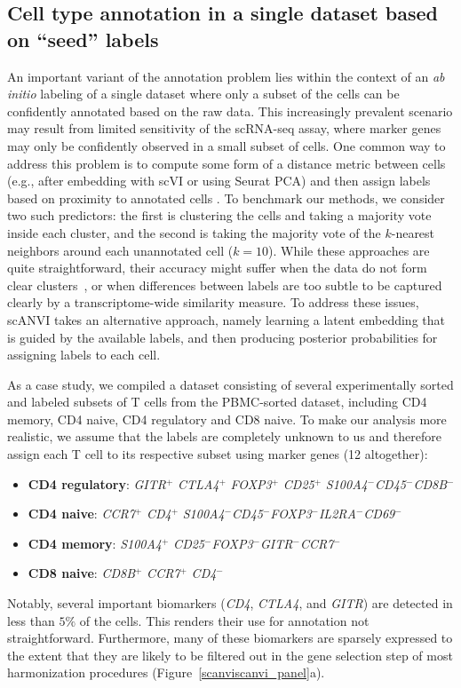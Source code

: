 \subsection{Cell type annotation in a single dataset based on ``seed'' labels}
An important variant of the annotation problem lies within the context of an \textit{ab initio} labeling of a single dataset where only a subset of the cells can be confidently annotated based on the raw data. This increasingly prevalent scenario may result from limited sensitivity of the scRNA-seq assay, where marker genes may only be confidently observed in a small subset of cells. One common way to address this problem is to compute some form of a distance metric between cells (e.g., after embedding with scVI or using Seurat PCA) and then assign labels based on proximity to annotated cells \cite{zheng2017massively}. To benchmark our methods, we consider two such predictors: the first is clustering the cells and taking a majority vote inside each cluster, and the second is taking the majority vote of the $k$-nearest neighbors around each unannotated cell ($k=10$). While these approaches are quite straightforward, their accuracy might suffer when the data do not form clear clusters~\cite{Tusi2018}, or when differences between labels are too subtle to be captured clearly by a transcriptome-wide similarity measure. To address these issues, scANVI takes an alternative approach, namely learning a latent embedding that is guided by the available labels, and then producing posterior probabilities for assigning labels to each cell. 

As a case study, we compiled a dataset consisting of several experimentally sorted and labeled subsets of T cells from the PBMC-sorted dataset, including CD4 memory, CD4 naive, CD4 regulatory and CD8 naive. To make our analysis more realistic, we assume that the labels are completely unknown to us and therefore assign each T cell to its respective subset using marker genes (12 altogether):
\begin{itemize}
    \item \textbf{CD4 regulatory}: \textit{GITR}$^+$ \textit{CTLA4}$^+$ \textit{FOXP3}$^+$ \textit{CD25}$^+$ \textit{S100A4}$^-$\textit{CD45}$^-$\textit{CD8B}$^-$
    \item \textbf{CD4 naive}: \textit{CCR7}$^+$ \textit{CD4}$^+$ \textit{S100A4}$^-$\textit{CD45}$^-$\textit{FOXP3}$^-$\textit{IL2RA}$^-$\textit{CD69}$^-$
    \item \textbf{CD4 memory}: \textit{S100A4}$^+$ \textit{CD25}$^-$\textit{FOXP3}$^-$\textit{GITR}$^-$\textit{CCR7}$^-$
    \item \textbf{CD8 naive}: \textit{CD8B}$^+$ \textit{CCR7}$^+$ \textit{CD4}$^-$
    \end{itemize}
Notably, several important biomarkers (\textit{CD4}, \textit{CTLA4}, and \textit{GITR}) are detected in less than $5 \%$ of the cells. This renders their use for annotation not straightforward. Furthermore, many of these biomarkers are sparsely expressed to the extent that they are likely to be filtered out in the gene selection step of most harmonization procedures (Figure~\ref{scanviscanvi_panel}a). 


